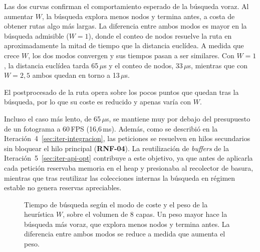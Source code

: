 Las dos curvas confirman el comportamiento esperado de la búsqueda voraz.
Al aumentar $W$, la búsqueda explora menos nodos y termina antes, a costa de obtener rutas algo más largas.
La diferencia entre ambos modos es mayor en la búsqueda admisible ($W = 1$), donde el conteo de nodos resuelve la ruta en aproximadamente la mitad de tiempo que la distancia euclídea.
A medida que crece $W$, los dos modos convergen y sus tiempos pasan a ser similares.
Con $W = 1$, la distancia euclídea tarda 65\,$\mu$s y el conteo de nodos, 33\,$\mu$s, mientras que con $W = 2{,}5$ ambos quedan en torno a 13\,$\mu$s.

El postprocesado de la ruta opera sobre los pocos puntos que quedan tras la búsqueda, por lo que su coste es reducido y apenas varía con $W$.

Incluso el caso más lento, de 65\,$\mu$s, se mantiene muy por debajo del presupuesto de un fotograma a 60\,FPS (16,6\,ms).
Además, como se describió en la Iteración~4~\ref{sec:iter-integracion}, las peticiones se resuelven en hilos secundarios sin bloquear el hilo principal (\textbf{RNF-04}).
La reutilización de \textit{buffers} de la Iteración~5~\ref{sec:iter-api-opt} contribuye a este objetivo, ya que antes de aplicarla cada petición reservaba memoria en el \gls{heap} y presionaba al recolector de basura, mientras que tras reutilizar las colecciones internas la búsqueda en régimen estable no genera reservas apreciables.

\begin{figure}[htp]
  \centering
  \caption[Tiempo de búsqueda según el modo de coste y el peso de la heurística.]
  {Tiempo de búsqueda según el modo de coste y el peso de la heurística $W$, sobre el volumen de 8 capas.
  Un peso mayor hace la búsqueda más voraz, que explora menos nodos y termina antes.
  La diferencia entre ambos modos se reduce a medida que aumenta el peso.}
  \label{fig:pathfinding-times}
\end{figure}

